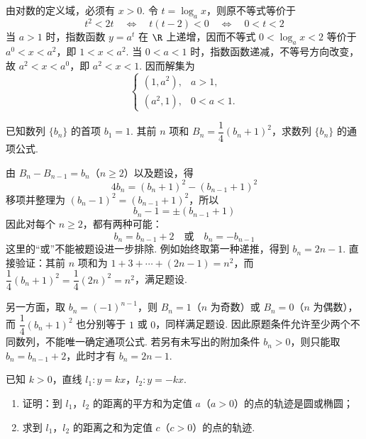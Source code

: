 \begin{solution}
由对数的定义域，必须有 \(x>0\). 令 \(t=\log_a x\)，则原不等式等价于
\[
t^2<2t
\quad\Longleftrightarrow\quad
t(t-2)<0
\quad\Longleftrightarrow\quad
0<t<2
\]
当 \(a>1\) 时，指数函数 \(y=a^t\) 在 \(\R\) 上递增，因而不等式 \(0<\log_a x<2\) 等价于
\(a^0<x<a^2\)，即 \(1<x<a^2\). 当 \(0<a<1\) 时，指数函数递减，不等号方向改变，故
\(a^2<x<a^0\)，即 \(a^2<x<1\). 因而解集为
\[
\begin{cases}
(1,a^{2}),&a>1,\\
(a^{2},1),&0<a<1.
\end{cases}
\]
\end{solution}

\begin{problem}
已知数列 \(\{b_{n}\}\) 的首项 \(b_{1}=1\). 其前 \(n\) 项和 \(B_{n}=\dfrac{1}{4}(b_{n}+1)^{2}\)，求数列 \(\{b_{n}\}\) 的通项公式.
\end{problem}

\begin{solution}
由 \(B_{n}-B_{n-1}=b_{n}\)（\(n\geqslant2\)）以及题设，得
\[
4b_{n}=(b_{n}+1)^{2}-(b_{n-1}+1)^{2}
\]
移项并整理为 \((b_{n}-1)^{2}=(b_{n-1}+1)^{2}\)，所以
\[
b_{n}-1=\pm(b_{n-1}+1)
\]
因此对每个 \(n\geqslant2\)，都有两种可能：
\[
b_{n}=b_{n-1}+2\quad\text{或}\quad b_{n}=-b_{n-1}
\]
这里的“或”不能被题设进一步排除. 例如始终取第一种递推，得到 \(b_n=2n-1\). 直接验证：其前 \(n\) 项和为 \(1+3+\cdots+(2n-1)=n^2\)，而
\(\dfrac14(b_n+1)^2=\dfrac14(2n)^2=n^2\)，满足题设.

另一方面，取 \(b_n=(-1)^{n-1}\)，则 \(B_n=1\)（\(n\) 为奇数）或 \(B_n=0\)（\(n\) 为偶数），而 \(\dfrac14(b_n+1)^2\) 也分别等于 \(1\) 或 \(0\)，同样满足题设. 因此原题条件允许至少两个不同数列，不能唯一确定通项公式. 若另有未写出的附加条件 \(b_n>0\)，则只能取 \(b_n=b_{n-1}+2\)，此时才有 \(b_n=2n-1\).
\end{solution}

\begin{problem}
已知 \(k>0\)，直线 \(l_{1}:y=kx\)，\(l_{2}:y=-kx\).

\begin{enumerate}
\item 证明：到 \(l_{1}\)，\(l_{2}\) 的距离的平方和为定值 \(a\)（\(a>0\)）的点的轨迹是圆或椭圆；
\item 求到 \(l_{1}\)，\(l_{2}\) 的距离之和为定值 \(c\)（\(c>0\)）的点的轨迹.
\end{enumerate}
\end{problem}


